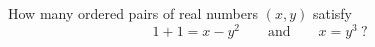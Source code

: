 How many ordered pairs of real numbers $(x,y)$ satisfy
\[1+1=x-y^2\qquad\text{and}\qquad x=y^3\ ?\]
